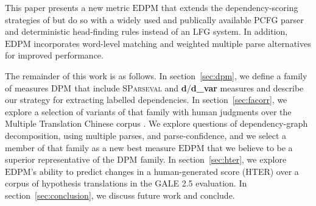 \documentclass[11pt]{article}
\newcommand{\DPM}[1]{\ensuremath{\mathrm{DPM}_{#1}}}
\newcommand{\myEDPM}[0]{\ensuremath{\mathrm{EDPM}}}
\begin{document}
This paper presents a new metric \myEDPM{} that extends the
dependency-scoring strategies of 
but do so with a widely used and publically available PCFG parser and
deterministic head-finding rules instead of an LFG system. In
addition, \myEDPM{} incorporates word-level matching and weighted multiple
parse alternatives for improved performance.

The remainder of this work is as follows. In section~\ref{sec:dpm}, we
define a family of measures \DPM{} that include \textsc{SParseval} and
\textbf{d}/\textbf{d\_var} measures and describe our strategy for
extracting labelled dependencies. In section~\ref{sec:facorr}, we
explore a selection of variants of that family with human judgments
over the Multiple Translation Chinese corpus
\cite{LDC03MTC2,LDC06MTC4}. We explore questions of dependency-graph
decomposition, %
using multiple parses, and parse-confidence, and we select a member of
that family as a new best measure \myEDPM{} that we believe to be a
superior representative of the \DPM{} family.
%
In section~\ref{sec:hter}, we explore \myEDPM{}'s ability to predict
changes in a human-generated score (HTER) over a corpus of hypothesis
translations in the GALE 2.5 \cite{darpa08gale}
evaluation. In section~\ref{sec:conclusion}, we discuss future work
and conclude.

\end{document}
